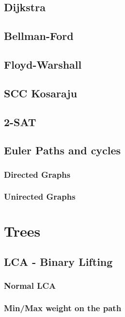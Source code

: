 	\subsection{Dijkstra}
	
	\subsection{Bellman-Ford}
	
	\subsection{Floyd-Warshall}
	\subsection{SCC Kosaraju}
	\subsection{2-SAT}
	\subsection{Euler Paths and cycles}
	\subsubsection{Directed Graphs}
	\subsubsection{Unirected Graphs}
	
	\newpage
	
	\section{Trees}
	\subsection{LCA - Binary Lifting}
	\subsubsection{Normal LCA}
	\subsubsection{Min/Max weight on the path}
